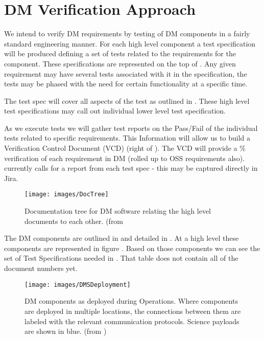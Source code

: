 \section{DM Verification Approach \label{approach}}

We intend to verify DM requirements by testing of DM components in a fairly standard engineering manner.
For each high level component a test specification will be produced defining a set of tests related to the requirements for the component. 
These specifications are represented on the top of .
Any given  requirement may have several tests associated with it in the specification, the tests may be phased with the need for certain functionality at a specific time. 

The test spec will cover all aspects of the test as outlined in . These high level test specifications may call out individual lower level test specification. 

As we execute tests we will gather test reports on the Pass/Fail of the individual tests related to specific requirements.
This Information will allow us to build a Verification Control Document (VCD) (right of ).
The VCD will provide a \% verification of each requirement in DM (rolled up to OSS requirements also).
 currently calls for a report from each test spec - this may be captured directly in Jira.




\begin{figure}
\begin{center}
 \texttt{[image: images/DocTree]}
 \caption{Documentation tree for DM software relating the high level documents to each other. (from \label{fig:doctree}}

 \end{center}
 \end{figure}



 The DM components are  outlined in  and detailed in . At a high level these components are represented in figure .  Based on those components we can see the set of Test Specifications needed in . That table does not contain all of the document numbers yet. 


\begin{figure}[htbp]
	\begin{center}
		\texttt{[image: images/DMSDeployment]}
		\caption{DM components as deployed during Operations. Where components are
			deployed in multiple locations, the connections between them are labeled with
			the relevant communication protocols. Science payloads are shown in blue.
		\label{fig:dmsdeploy} (from )}
	\end{center}
\end{figure}

